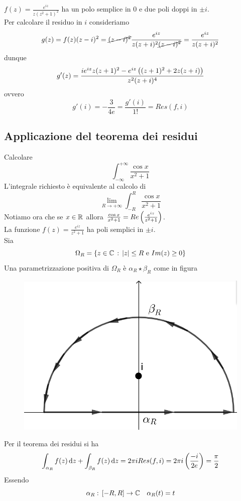 \begin{ese}$f(z)=\frac{e^{iz}}{z(z^2+1)^2}$ ha un polo semplice in $0$ e due poli doppi in $\pm i$.\\
Per calcolare il residuo in $i$ consideriamo
$$g(z) = f(z) (z-i)^2=\cancel{(z-i)^2}\frac{e^{iz}}{z(z+i)^2\cancel{(z-i)^2}} =\frac{e^{iz}}{z(z+i)^2}$$
dunque 
$$g'(z) = \frac{ie^{iz}z(z+1)^2 - e^{iz} \left( (z+1)^2 +2z(z+i) \right)}{z^2(z+i)^4} $$
ovvero
$$g'(i) = -\frac{3}{4e} = \frac{g'(i)}{1!} =Res(f,i)$$

\newpage
\subsection{Applicazione del teorema dei residui}
\begin{ese}Calcolare 
$$ \int_{-\infty}^{+\infty} \frac{\cos x }{x^2+1}$$
L'integrale richiesto \`e equivalente al calcolo di 
$$ \lim_{R \to + \infty} \int_{-R}^R \frac{\cos  x}{x^2 + 1 }$$
Notiamo ora che se $x\in \mathbb{R}$ allora $\frac{\cos x}{x^2 +1} =Re \left( \frac{e^{iz}}{z^2 +1 } \right)$.\\
La funzione $f(z) =\frac{e^{iz}}{z^2 +1 }$ ha poli semplici in $\pm i$.\\
Sia $$\Omega_R = \{ z\in \mathbb{C} \, : \, \left\vert z \right\vert \leq R \text{ e } Im(z) \geq 0 \}$$
Una parametrizzazione positiva di $\Omega_R$ \`e $\alpha_R \star \beta_R$ come in figura 
\begin{figure}[!h]
\centering
\includegraphics[scale=.5]{Figure/04_27_1}
\end{figure}
Per il teorema dei residui si ha 
$$\int_{\alpha_R} f(z) \, \mathrm{d}z +\int_{\beta_R} f(z) \, \mathrm{d}z = 2\pi i Res(f,i) = 2\pi i \left( \frac{-i}{2e}  \right)=\frac{\pi}{2}$$
Essendo 
$$\alpha_R:\, [-R,R]\to \mathbb{C} \quad \alpha_R(t) = t$$

\end{ese}
\end{ese}
